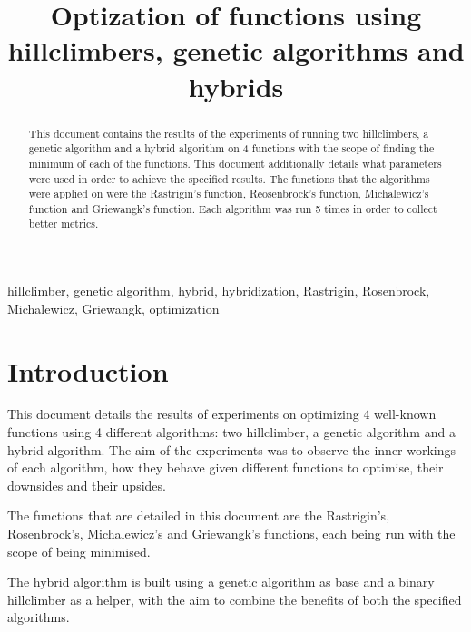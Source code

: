 \documentclass[conference]{IEEEtran}
\begin{document}
\title{Optization of functions using hillclimbers, genetic algorithms and hybrids}

\author{
}

\maketitle


\begin{abstract}
This document contains the results of the experiments of running two hillclimbers, a genetic algorithm and a hybrid algorithm
on 4 functions with the scope of finding the minimum of each of the functions. This document additionally details what parameters
were used in order to achieve the specified results. The functions that the algorithms were applied on were the
Rastrigin's function, Reosenbrock's function, Michalewicz's function and Griewangk's function. Each algorithm was run 5
times in order to collect better metrics.
\end{abstract}

\begin{IEEEkeywords}
hillclimber, genetic algorithm, hybrid, hybridization, Rastrigin, Rosenbrock, Michalewicz, Griewangk, optimization
\end{IEEEkeywords}


\section{Introduction}
This document details the results of experiments on optimizing 4 well-known functions using 4 different algorithms: two hillclimber,
a genetic algorithm and a hybrid algorithm. The aim of the experiments was to observe the inner-workings of each algorithm,
how they behave given different functions to optimise, their downsides and their upsides.

The functions that are detailed in this document are the Rastrigin's, Rosenbrock's, Michalewicz's and Griewangk's functions,
each being run with the scope of being minimised.

The hybrid algorithm is built using a genetic algorithm as base and a binary hillclimber as a helper, with the aim to combine the
benefits of both the specified algorithms.
\end{document}
